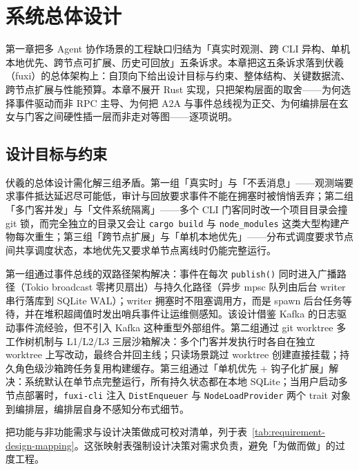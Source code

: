 
\section{系统总体设计}

第一章把多 Agent 协作场景的工程缺口归结为「真实时观测、跨 CLI 异构、单机本地优先、跨节点可扩展、历史可回放」五条诉求。本章把这五条诉求落到伏羲（fuxi）的总体架构上：自顶向下给出设计目标与约束、整体结构、关键数据流、跨节点扩展与性能预算。本章不展开 Rust 实现，只把架构层面的取舍——为何选择事件驱动而非 RPC 主导、为何把 A2A 与事件总线视为正交、为何编排层在玄女与门客之间硬性插一层而非走对等图——逐项说明。

\subsection{设计目标与约束}
\label{subsec:design-goals}

伏羲的总体设计需化解三组矛盾。第一组「真实时」与「不丢消息」——观测端要求事件抵达延迟尽可能低，审计与回放要求事件不能在拥塞时被悄悄丢弃；第二组「多门客并发」与「文件系统隔离」——多个 CLI 门客同时改一个项目目录会撞 git 锁，而完全独立的目录又会让 \texttt{cargo build} 与 \texttt{node\_modules} 这类大型构建产物每次重生；第三组「跨节点扩展」与「单机本地优先」——分布式调度要求节点间共享调度状态，本地优先又要求单节点离线时仍能完整运行。

第一组通过事件总线的双路径架构解决：事件在每次 \texttt{publish()} 同时进入广播路径（Tokio broadcast\parencite{tokio2024broadcast} 零拷贝扇出）与持久化路径（异步 mpsc 队列由后台 writer 串行落库到 SQLite WAL\parencite{sqlite2024wal}）；writer 拥塞时不阻塞调用方，而是 spawn 后台任务等待，并在堆积超阈值时发出哨兵事件让运维侧感知。该设计借鉴 Kafka 的日志驱动事件流经验\parencite{kreps2011kafka}，但不引入 Kafka 这种重型外部组件。第二组通过 git worktree\parencite{git2024worktree} 多工作树机制与 L1/L2/L3 三层沙箱解决：多个门客并发执行时各自在独立 worktree 上写改动，最终合并回主线；只读场景跳过 worktree 创建直接挂载；持久角色级沙箱跨任务复用构建缓存。第三组通过「单机优先 + 钩子化扩展」解决：系统默认在单节点完整运行，所有持久状态都在本地 SQLite；当用户启动多节点部署时，\texttt{fuxi-cli} 注入 \texttt{DistEnqueuer} 与 \texttt{NodeLoadProvider} 两个 trait 对象到编排层，编排层自身不感知分布式细节。

把功能与非功能需求与设计决策做成可校对清单，列于表~\ref{tab:requirement-design-mapping}。这张映射表强制设计决策对需求负责，避免「为做而做」的过度工程。

